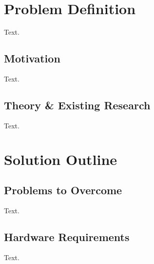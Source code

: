 \documentclass[a4paper, 12pt, english]{article}
\begin{document}

    \fullPageTitle

    \thispagestyle{noheader}
    \tableofcontents

    \vspace{2em}
    \listoffigures

    \vspace{2em}
    \listoftables

    \newpage

    \section{Problem Definition}
        \label{sec: Problem Definition}
        
        Text.
    

        \subsection{Motivation}
            \label{subsec: motivation}

            Text.


        \subsection{Theory \& Existing Research}
            \label{subsec: theory and existing research}

            Text.

    
    \section{Solution Outline}
        \label{sec: Solution Outline}

        \subsection{Problems to Overcome}
            \label{subsec: Problems to Overcome}

            Text.

            
        \subsection{Hardware Requirements}
            \label{subsec: Hardware Requirements}

            Text.
                
\end{document}
